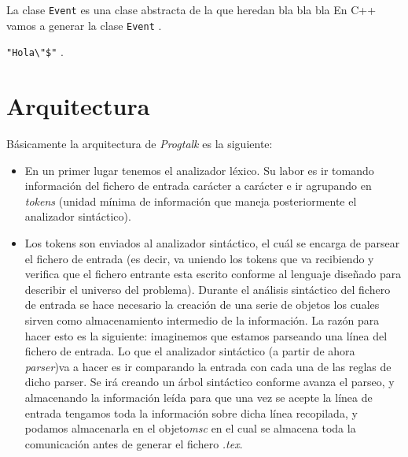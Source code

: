 \documentclass[12pt,a4paper]{report}
\begin{document}
La clase \lstinline{Event} es una clase abstracta de la que heredan bla bla bla En C++ vamos a generar la clase \lstinline[style=code,language=C++]{Event} .

\verb~"Hola\"$"~ .

\section{Arquitectura}

Básicamente la arquitectura de \textit{Progtalk} es la siguiente:
\begin{itemize}
\item En un primer lugar tenemos el analizador léxico. Su labor es ir tomando información del fichero de entrada carácter a carácter e ir agrupando en \textit{tokens} (unidad mínima de información que maneja posteriormente el analizador sintáctico).
\item Los tokens son enviados al analizador sintáctico, el cuál se encarga de parsear el fichero de entrada (es decir, va uniendo los tokens que va recibiendo y verifica que el fichero entrante esta escrito conforme al lenguaje diseñado para describir el universo del problema).
Durante el análisis sintáctico del fichero de entrada se hace necesario la creación de una serie de objetos los cuales sirven como almacenamiento intermedio de la información. La razón para hacer esto es la siguiente: imaginemos que estamos parseando una línea del fichero de entrada. Lo que el analizador sintáctico (a partir de ahora \textit{parser})va a hacer es ir comparando la entrada con cada una de las reglas de dicho parser. Se irá creando un árbol sintáctico conforme avanza el parseo, y almacenando la información leída para que una vez se acepte la línea de entrada tengamos toda la información sobre dicha línea recopilada, y podamos almacenarla en el objeto\textit{msc} en el cual se almacena toda la comunicación antes de generar el fichero \textit{.tex}.


\end{itemize}
\end{document}
